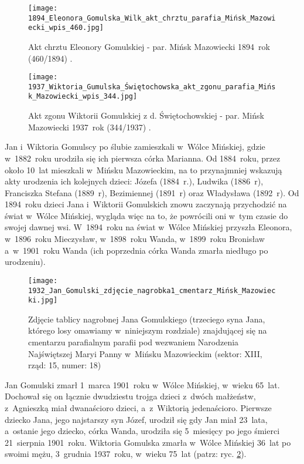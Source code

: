 \begin{figure}[!ht]
    \vspace*{0.5cm}
    \centering \texttt{[image: 
        1894\_Eleonora\_Gomulska\_Wilk\_akt\_chrztu\_parafia\_Mińsk\_Mazowiecki\_wpis\_460.jpg]}
    \captionsetup{format=hang}
    \caption{Akt chrztu Eleonory Gomulskiej - par. Mińsk Mazowiecki
    1894~rok (460/1894)
    \cite{par_minsk2}.}
    \label{fig:egomulska_1894}
\end{figure}

\begin{figure}[!ht]
    \vspace*{0.5cm}
    \centering \texttt{[image: 
        1937\_Wiktoria\_Gumulska\_Świętochowska\_akt\_zgonu\_parafia\_Mińsk\_Mazowiecki\_wpis\_344.jpg]}
    \captionsetup{format=hang}
    \caption{Akt zgonu Wiktorii Gomulskiej z d. Świętochowskiej - par. Mińsk Mazowiecki 
    1937~rok (344/1937) \cite{par_minsk2}.}
    \label{fig:wgomulska_1937}
\end{figure}

Jan i~Wiktoria Gomulscy po ślubie zamieszkali w~Wólce Mińskiej, gdzie
w~1882~roku urodziła się ich pierwsza córka Marianna. Od 1884~roku, przez
około 10~lat mieszkali w~Mińsku Mazowieckim, na to przynajmniej wskazują akty
urodzenia ich kolejnych dzieci: Józefa (1884~r.), Ludwika (1886~r), Franciszka
Stefana (1889~r), Bezimiennej (1891~r) oraz Władysława (1892~r). Od 1894~roku
dzieci Jana i~Wiktorii Gomulskich znowu zaczynają przychodzić na świat w~Wólce
Mińskiej, wygląda więc na to, że powrócili oni w~tym czasie do swojej dawnej
wsi. W~1894~roku na świat w~Wólce Mińskiej przyszła Eleonora, w~1896~roku
Mieczysław, w~1898~roku Wanda, w~1899~roku Bronisław a~w~1901~roku Wanda
(ich poprzednia córka Wanda zmarła niedługo po urodzeniu).

\begin{figure}[!ht]
    \vspace*{0.4cm}
    \centering \texttt{[image: 
        1932\_Jan\_Gomulski\_zdjęcie\_nagrobka1\_cmentarz\_Mińsk\_Mazowiecki.jpg]}
    \captionsetup{format=hang}
    \caption{Zdjęcie tablicy nagrobnej Jana Gomulskiego (trzeciego syna Jana,
    którego losy omawiamy w~niniejszym rozdziale) znajdującej się na cmentarzu
    parafialnym parafii pod wezwaniem Narodzenia Najświętszej Maryi Panny
    w~Mińsku Mazowieckim (sektor: XIII, rząd: 15, numer: 18)}
    \label{fig:jgomulski_1932}
\end{figure}

Jan Gomulski zmarł 1~marca 1901~roku w~Wólce Mińskiej, w~wieku 65~lat.
Dochował się on łącznie dwudziestu trojga dzieci z~dwóch małżeństw, 
z~Agnieszką miał dwanaścioro dzieci, a~z~Wiktorią jedenaścioro. Pierwsze
dziecko Jana, jego najstarszy syn Józef, urodził się gdy Jan miał 23~lata,
a~ostanie jego dziecko, córka Wanda, urodziła się 5~miesięcy po jego śmierci
21~sierpnia 1901~roku. Wiktoria Gomulska zmarła w~Wólce Mińskiej 36~lat po
swoimi mężu, 3~grudnia 1937~roku, w~wieku 75~lat (patrz: ryc.
\ref{fig:wgomulska_1937}).

